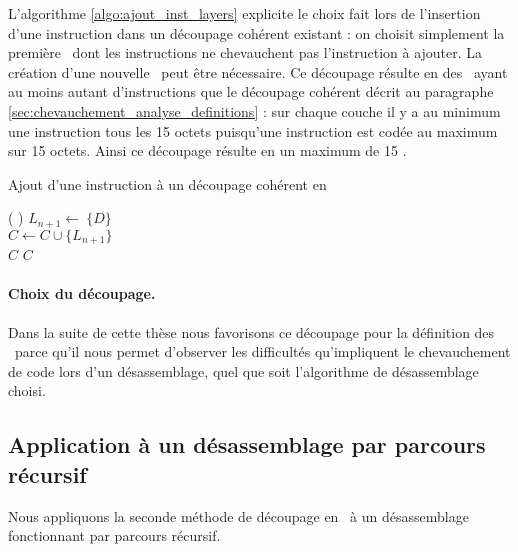 
L'algorithme \ref{algo:ajout_inst_layers} explicite le choix fait lors de l'insertion d'une instruction dans un découpage cohérent existant : on choisit simplement la première \layer\ dont les instructions ne chevauchent pas l'instruction à ajouter. La création d'une nouvelle \layer\ peut être nécessaire. 
Ce découpage résulte en des \layers\ ayant au moins autant d'instructions que le découpage cohérent décrit au paragraphe \ref{sec:chevauchement_analyse_definitions} : sur chaque couche il y a au minimum une instruction tous les 15 octets puisqu'une instruction est codée au maximum sur 15 octets. Ainsi ce découpage résulte en un maximum de 15 \layers.

\begin{algorithm}[H] %
\caption{Ajout d'une instruction à un découpage cohérent en \layers}
\SetAlgoLined
{}
\Fn(
){}{
 {
  $L_{n+1}\leftarrow\ \{D\}$ \\
  $C\leftarrow C\cup\{L_{n+1}\}$ \\
  \Return $C$
}
{
  \Return $C$
}
}
\label{algo:ajout_inst_layers}
\end{algorithm}


\paragraph{Choix du découpage.}
Dans la suite de cette thèse nous favorisons ce découpage pour la définition des \layers\ parce qu'il nous permet d'observer les difficultés qu'impliquent le chevauchement de code lors d'un désassemblage, quel que soit l'algorithme de désassemblage choisi.

\subsection{Application à un désassemblage par parcours récursif\label{sec:layers_decoupage_recursif}}
Nous appliquons la seconde méthode de découpage en \layers\ à un désassemblage fonctionnant par parcours récursif.

